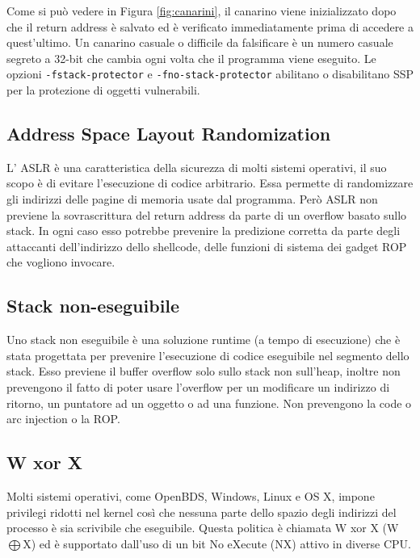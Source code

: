 Come si può vedere in Figura \ref{fig:canarini}, il canarino viene inizializzato dopo
che il return address è salvato ed è verificato
immediatamente prima di accedere a quest'ultimo. Un canarino casuale o difficile da
falsificare è un numero casuale segreto a 32-bit che cambia ogni
volta che il programma viene eseguito. Le opzioni \verb|-fstack-protector|
e \verb|-fno-stack-protector| abilitano o disabilitano SSP per la protezione di
oggetti vulnerabili.

\subsection{Address Space Layout Randomization}

L' ASLR è una caratteristica della sicurezza di molti sistemi operativi, il suo scopo
è di evitare l'esecuzione di codice arbitrario. Essa permette di randomizzare gli
indirizzi delle pagine di memoria usate dal programma. Però ASLR non previene la
sovrascrittura del return address da parte di un overflow basato sullo stack. In ogni
caso esso potrebbe prevenire la predizione corretta da parte degli attaccanti
dell'indirizzo dello shellcode, delle funzioni di sistema dei gadget ROP che
vogliono invocare.

\subsection{Stack non-eseguibile}

Uno stack non eseguibile è una soluzione runtime (a tempo di esecuzione) che è stata
progettata per prevenire l'esecuzione di codice eseguibile  nel segmento dello stack.
Esso previene il buffer overflow solo sullo stack non sull'heap, inoltre non prevengono
il fatto di poter usare l'overflow per un modificare un indirizzo di ritorno, un
puntatore ad un oggetto o ad una funzione. Non prevengono la code o arc injection
o la ROP.

\subsection{W xor X}

Molti sistemi operativi, come OpenBDS, Windows, Linux e OS X, impone privilegi ridotti
nel kernel così
che nessuna parte dello spazio degli indirizzi del processo è sia scrivibile che
eseguibile.
Questa politica è chiamata W xor X (W$\bigoplus$X) ed è supportato dall'uso di un
bit No eXecute (NX) attivo in diverse CPU.